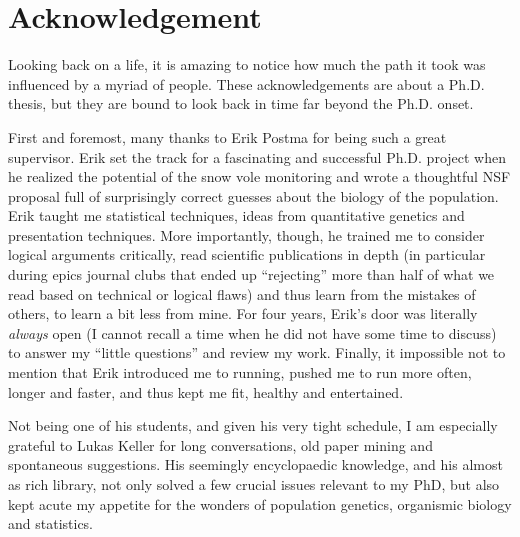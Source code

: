 
\chapter{Acknowledgement}

Looking back on a life, it is amazing to notice how much the path it took was influenced by a myriad of people. These acknowledgements are about a Ph.D. thesis, but they are bound to look back in time far beyond the Ph.D. onset.

First and foremost, many thanks to Erik Postma for being such a great supervisor. Erik set the track for a fascinating and successful Ph.D. project when he realized the potential of the snow vole monitoring and wrote a thoughtful NSF proposal full of surprisingly correct guesses about the biology of the population. Erik taught me statistical techniques, ideas from quantitative genetics and presentation techniques. More importantly, though, he trained me to consider logical arguments critically, read scientific publications in depth (in particular during epics journal clubs that ended up ``rejecting'' more than half of what we read based on technical or logical flaws) and thus learn from the mistakes of others, to learn a bit less from mine. For four years, Erik's door was literally \emph{always} open (I cannot recall a time when he did not have some time to discuss) to answer my ``little questions'' and review my work.
Finally, it impossible not to mention that Erik introduced me to running, pushed me to run more often, longer and faster, and thus kept me fit, healthy and entertained.

Not being one of his students, and given his very tight schedule, I am especially grateful to Lukas Keller for long conversations, old paper mining and spontaneous suggestions. His seemingly encyclopaedic knowledge, and his almost as rich library, not only solved a few crucial issues relevant to my PhD, but also kept acute my appetite for the wonders of population genetics, organismic biology and statistics. 

